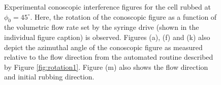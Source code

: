 \begin{figure}
\begin{center}
\end{center}
\caption[Experimental conoscopic figures as a function of flow rate ($\phi_0=45^{\circ}$)]{\label{fig:45_data} Experimental conoscopic interference figures for the cell rubbed at $\phi_0=45^{\circ}$. Here, the rotation of the conoscopic figure as a function of the volumetric flow rate set by the syringe drive (shown in the individual figure caption) is observed. Figures (a), (f) and (k) also depict the azimuthal angle of the conoscopic figure as measured relative to the flow direction from the automated routine described by Figure \ref{fig:rotation1}. Figure (m) also shows the flow direction and initial rubbing direction.}
\end{figure}

